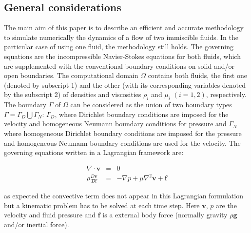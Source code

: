 \documentclass[a4paper,conference]{IEEEtran}
\begin{document}
\subsection{General considerations}\label{GeneralFor}

The main aim of this paper is to describe an efficient and accurate methodology to simulate numerically the dynamics of a flow of two immiscible fluids. In the particular case of using one fluid, the methodology still holds. The governing equations are the incompressible Navier-Stokes equations for both fluids, which are supplemented with the conventional boundary conditions on solid and/or open boundaries. The computational domain $\Omega$ contains both fluids, the first one (denoted by subscript 1) and the other (with its corresponding variables denoted by the subscript 2) of densities and viscosities $\rho_i$ and $\mu_i$ $(i=1,2)$, respectively. The boundary $\Gamma$ of $\Omega$ can be considered as the union of two boundary types $\Gamma=\Gamma_D\bigcup\Gamma_N$: $\Gamma_D$, where Dirichlet boundary conditions are imposed for the velocity and homogeneous Neumann boundary conditions for pressure and $\Gamma_N$ where homogeneous Dirichlet boundary conditions are imposed for the pressure and homogeneous Neumann boundary conditions are used for the velocity. The governing equations written in a Lagrangian framework are:

\begin{eqnarray}
  \nabla \cdot \mathbf{v} &=& 0 \label{eq:continuity} \\
  \rho\frac{D\mathbf{v}}{Dt} &=& -\nabla p + \mu \nabla^2 \mathbf{v} + \mathbf{f}\label{eq:momentum}
\end{eqnarray}

as expected the convective term does not appear in this Lagrangian formulation but a kinematic problem has to be solved at each time step. Here $\mathbf{v}$, $p$ are the velocity and fluid pressure and $\mathbf{f}$ is a external body force (normally gravity $\rho \mathbf{g}$ and/or inertial force).

\end{document}
